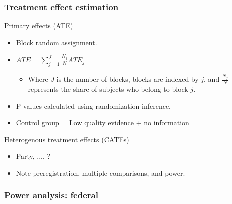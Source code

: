 \documentclass[usenames,dvipsnames]{beamer}
\begin{document}

\begin{frame}
\frametitle{Treatment effect estimation}

Primary effects (ATE)
\begin{itemize}
\item Block random assignment.
\item $ATE = \sum_{j = 1}^{J} \frac{N_j}{N}ATE_j$
\begin{itemize}
\item Where $J$ is the number of blocks, blocks are indexed by $j$, and $\frac{N_j}{N}$ represents the share of subjects who belong to block $j$. 
\end{itemize}
\item P-values calculated using randomization inference.
\item Control group = Low quality evidence + no information
\vspace{0.5cm}
\end{itemize}
Heterogenous treatment effects (CATEs)
\begin{itemize}
\item Party, ..., ?
\item Note preregistration, multiple comparisons, and power.
\end{itemize}

\end{frame}


\begin{frame}
\frametitle{Power analysis: federal}


\end{frame}
\end{document}
